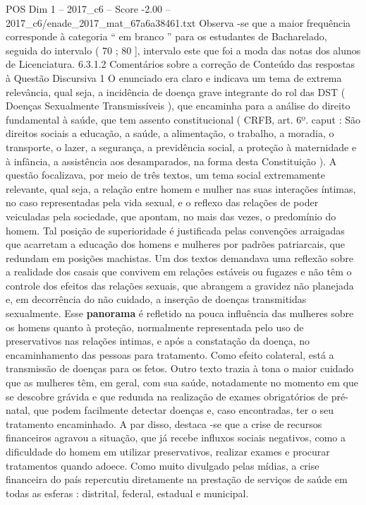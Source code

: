 \begin{textsample}{POS Dim 1 – 2017\_c6 – Score -2.00 – 2017\_c6/enade\_2017\_mat\_67a6a38461.txt}
Observa -se que a maior frequência corresponde à categoria “ em branco ” para os estudantes de Bacharelado, seguida do intervalo ( 70 ; 80 ], intervalo este que foi a moda das notas dos alunos de Licenciatura. 6.3.1.2 Comentários sobre a correção de Conteúdo das respostas à Questão Discursiva 1 O enunciado era claro e indicava um tema de extrema relevância, qual seja, a incidência de doença grave integrante do rol das DST ( Doenças Sexualmente Transmissíveis ), que encaminha para a análise do direito fundamental à saúde, que tem assento constitucional ( CRFB, art. 6º. caput : São direitos sociais a educação, a saúde, a alimentação, o trabalho, a moradia, o transporte, o lazer, a segurança, a previdência social, a proteção à maternidade e à infância, a assistência aos desamparados, na forma desta Constituição ).
A questão focalizava, por meio de três textos, um tema social extremamente relevante, qual seja, a relação entre homem e mulher nas suas interações íntimas, no caso representadas pela vida sexual, e o reflexo das relações de poder veiculadas pela sociedade, que apontam, no mais das vezes, o predomínio do homem.
Tal posição de superioridade é justificada pelas convenções arraigadas que acarretam a educação dos homens e mulheres por padrões patriarcais, que redundam em posições machistas.
Um dos textos demandava uma reflexão sobre a realidade dos casais que convivem em relações estáveis ou fugazes e não têm o controle dos efeitos das relações sexuais, que abrangem a gravidez não planejada e, em decorrência do não cuidado, a inserção de doenças transmitidas sexualmente.
Esse \textbf{panorama} é refletido na pouca influência das mulheres sobre os homens quanto à proteção, normalmente representada pelo uso de preservativos nas relações intimas, e após a constatação da doença, no encaminhamento das pessoas para tratamento.
Como efeito colateral, está a transmissão de doenças para os fetos.
Outro texto trazia à tona o maior cuidado que as mulheres têm, em geral, com sua saúde, notadamente no momento em que se descobre grávida e que redunda na realização de exames obrigatórios de pré-natal, que podem facilmente detectar doenças e, caso encontradas, ter o seu tratamento encaminhado.
A par disso, destaca -se que a crise de recursos financeiros agravou a situação, que já recebe influxos sociais negativos, como a dificuldade do homem em utilizar preservativos, realizar exames e procurar tratamentos quando adoece.
Como muito divulgado pelas mídias, a crise financeira do país repercutiu diretamente na prestação de serviços de saúde em todas as esferas : distrital, federal, estadual e municipal.

\end{textsample}
